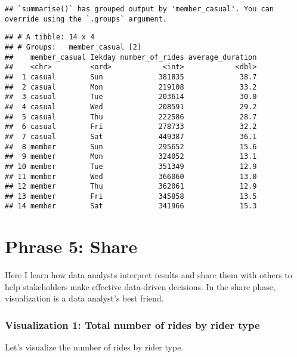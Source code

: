 \documentclass[
]{article}
\begin{document}
\begin{verbatim}
## `summarise()` has grouped output by 'member_casual'. You can override using the `.groups` argument.
\end{verbatim}

\begin{verbatim}
## # A tibble: 14 x 4
## # Groups:   member_casual [2]
##    member_casual Iekday number_of_rides average_duration
##    <chr>         <ord>            <int>            <dbl>
##  1 casual        Sun             381835             38.7
##  2 casual        Mon             219108             33.2
##  3 casual        Tue             203614             30.0
##  4 casual        Wed             208591             29.2
##  5 casual        Thu             222586             28.7
##  6 casual        Fri             278733             32.2
##  7 casual        Sat             449387             36.1
##  8 member        Sun             295652             15.6
##  9 member        Mon             324052             13.1
## 10 member        Tue             351349             12.9
## 11 member        Wed             366060             13.0
## 12 member        Thu             362061             12.9
## 13 member        Fri             345858             13.5
## 14 member        Sat             341966             15.3
\end{verbatim}

\hypertarget{phrase-5-share}{%
\section{Phrase 5: Share}\label{phrase-5-share}}

Here I learn how data analysts interpret results and share them with
others to help stakeholders make effective data-driven decisions. In the
share phase, visualization is a data analyst's best friend.

\hypertarget{visualization-1-total-number-of-rides-by-rider-type}{%
\subsubsection{Visualization 1: Total number of rides by rider
type}\label{visualization-1-total-number-of-rides-by-rider-type}}

Let's visualize the number of rides by rider type.
\end{document}

